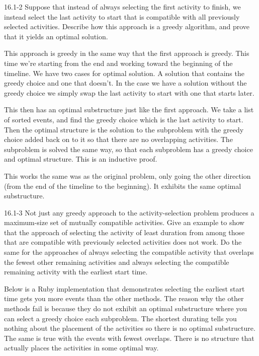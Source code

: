 \begin{problem}{16.1-2}
  Suppose that instead of always selecting the first activity to finish, we instead select the last activity to start
  that is compatible with all previously selected activities. Describe how this approach is a greedy algorithm, and
  prove that it yields an optimal solution.
  \begin{solution}
    This approach is greedy in the same way that the first approach is greedy. This time we're starting from the end and
    working toward the beginning of the timeline. We have two cases for optimal solution. A solution that contains the
    greedy choice and one that doesn't. In the case we have a solution without the greedy choice we simply swap the last
    activity to start with one that starts later.

    This then has an optimal substructure just like the first approach. We take a list of sorted events, and find the
    greedy choice which is the last activity to start. Then the optimal structure is the solution to the subproblem with
    the greedy choice added back on to it so that there are no overlapping activities. The subproblem is solved the same
    way, so that each subproblem has a greedy choice and optimal structure. This is an inductive proof.

    This works the same was as the original problem, only going the other direction (from the end of the timeline to the
    beginning). It exhibits the same optimal substructure.
  \end{solution}
\end{problem}

\begin{problem}{16.1-3}
  Not just any greedy approach to the activity-selection problem produces a maximum-size set of mutually compatible
  activities. Give an example to show that the approach of selecting the activity of least duration from among those
  that are compatible with previously selected activities does not work. Do the same for the approaches of always
  selecting the compatible activity that overlaps the fewest other remaining activities and always selecting the
  compatible remaining activity with the earliest start time.
  \begin{solution}
    Below is a Ruby implementation that demonstrates selecting the earliest start time gets you more events than the
    other methods. The reason why the other methods fail is because they do not exhibit an optimal substructure where
    you can select a greedy choice each subproblem. The shortest durating tells you nothing about the placement of the
    activities so there is no optimal substructure. The same is true with the events with fewest overlaps. There is no
    structure that actually places the activities in some optimal way.
    
  \end{solution}
\end{problem}


